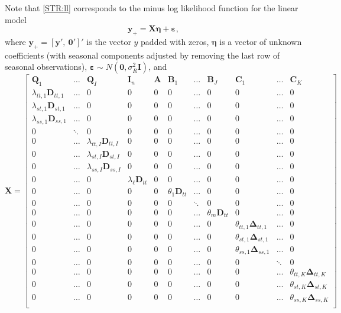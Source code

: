 \documentclass[11pt,a4paper,]{article}
\begin{document}
Note that \eqref{STR:ll} corresponds to the minus log likelihood function for the linear model
\begin{equation}
  \label{STR:linear_model}
  \bm{y}_{+} = \bm{X}\bm{\eta} + \bm{\varepsilon} ,
\end{equation}
where \(\bm{y}_{+} = [\bm{y}',~ \bm{0}']'\) is the vector \(y\) padded with zeros,
\(\bm{\eta}\) is a vector of unknown coefficients (with seasonal components adjusted by removing the last row of seasonal observations),
\(\bm{\varepsilon} \sim N(\bm{0},\sigma_R^2\bm{I})\),
and
\begin{equation}
  \label{regr:X}
  \bm{X} =
  \begin{bmatrix}
 \bm{Q}_1 & \dots & \bm{Q}_I & \bm{I}_n & \bm{A} & \bm{B}_1 & \dots & \bm{B}_J & \bm{C}_1 & \dots & \bm{C}_K \\
 \lambda_{tt,1} \bm{D}_{tt,1} & \dots & 0 & 0 & 0 & 0 & \dots & 0 & 0 & \dots & 0 \\
 \lambda_{st,1} \bm{D}_{st,1} & \dots & 0 & 0 & 0 & 0 & \dots & 0 & 0 & \dots & 0 \\
 \lambda_{ss,1} \bm{D}_{ss,1} & \dots & 0 & 0 & 0 & 0 & \dots & 0 & 0 & \dots & 0 \\
 0 & \ddots & 0 & 0 & 0 & 0 & \dots & 0 & 0 & \dots & 0 \\
 0 & \dots & \lambda_{tt,I} \bm{D}_{tt,I} & 0 & 0 & 0 & \dots & 0 & 0 & \dots & 0\\
 0 & \dots & \lambda_{st,I} \bm{D}_{st,I} & 0 & 0 & 0 & \dots & 0 & 0 & \dots & 0 \\
 0 & \dots & \lambda_{ss,I} \bm{D}_{ss,I} & 0 & 0 & 0 & \dots & 0 & 0 & \dots & 0 \\
 0 & \dots & 0 & \lambda_\ell \bm{D}_{tt} & 0 & 0 & \dots & 0 & 0 & \dots & 0 \\
 0 & \dots & 0 & 0 & 0 & \theta_1 \bm{D}_{tt} & \dots & 0 & 0 & \dots & 0 \\
 0 & \dots & 0 & 0 & 0 & 0 & \ddots & 0 & 0 & \dots & 0 \\
 0 & \dots & 0 & 0 & 0 & 0 & \dots & \theta_m \bm{D}_{tt} & 0 & \dots & 0 \\
 0 & \dots & 0 & 0 & 0 & 0 & \dots & 0 & \theta_{tt,1} \bm{\Delta}_{tt,1} & \dots & 0 \\
 0 & \dots & 0 & 0 & 0 & 0 & \dots & 0 & \theta_{st,1} \bm{\Delta}_{st,1} & \dots & 0 \\
 0 & \dots & 0 & 0 & 0 & 0 & \dots & 0 & \theta_{ss,1} \bm{\Delta}_{ss,1} & \dots & 0 \\
 0 & \dots & 0 & 0 & 0 & 0 & \dots & 0 & 0 & \ddots & 0 \\
 0 & \dots & 0 & 0 & 0 & 0 & \dots & 0 & 0 & \dots & \theta_{tt,K} \bm{\Delta}_{tt,K} \\
 0 & \dots & 0 & 0 & 0 & 0 & \dots & 0 & 0 & \dots & \theta_{st,K} \bm{\Delta}_{st,K} \\
 0 & \dots & 0 & 0 & 0 & 0 & \dots & 0 & 0 & \dots & \theta_{ss,K} \bm{\Delta}_{ss,K} \\
  \end{bmatrix}
\end{equation}
\end{document}

